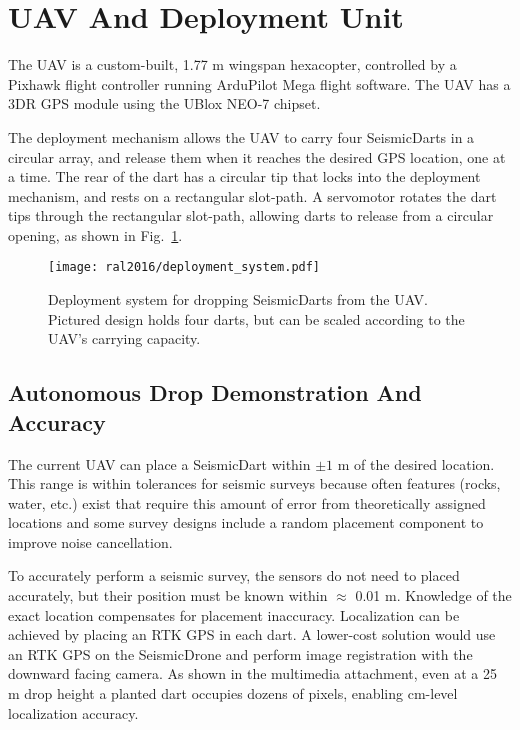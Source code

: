 \section[Deployment Unit (UAV)]{UAV And Deployment Unit}

The UAV is a custom-built, 1.77 m wingspan hexacopter, controlled by a Pixhawk flight controller running ArduPilot Mega flight software.
The UAV has a 3DR GPS module using the UBlox NEO-7 chipset.

The deployment mechanism allows the UAV to carry four SeismicDarts in a circular array, and release them when it reaches the desired GPS location, one at a time.
The rear of the dart has a circular tip that locks into the deployment mechanism, and rests on a rectangular slot-path.
A servomotor rotates the dart tips through the rectangular slot-path, allowing darts to release from a circular opening,  as shown in Fig.~\ref{fig:deployment_system}.

\begin{figure} \centering
	{\texttt{[image: ral2016/deployment\_system.pdf]}}
	\caption{
		Deployment system for dropping SeismicDarts from the UAV.
		Pictured design holds four darts, but can be scaled according to the UAV's carrying capacity.}
	\label{fig:deployment_system}
\end{figure}

\subsection{Autonomous Drop Demonstration And Accuracy}

The current UAV can place a SeismicDart within $\pm1$ m of the desired location.
This range is within tolerances for seismic surveys because often features (rocks, water, etc.) exist that require this amount of error from theoretically assigned locations and some survey designs include a random placement component to improve noise cancellation.

To accurately perform a seismic survey, the sensors do not need to placed accurately, but their position must be known within $\approx$ 0.01 m.
Knowledge of the exact location compensates for placement inaccuracy.
Localization can be achieved by placing an RTK GPS in each dart.
A lower-cost solution would use an RTK GPS on the SeismicDrone and perform image registration with the downward facing camera.
As shown in the multimedia attachment, even at a 25 m drop height a planted dart occupies dozens of pixels, enabling cm-level localization accuracy.


